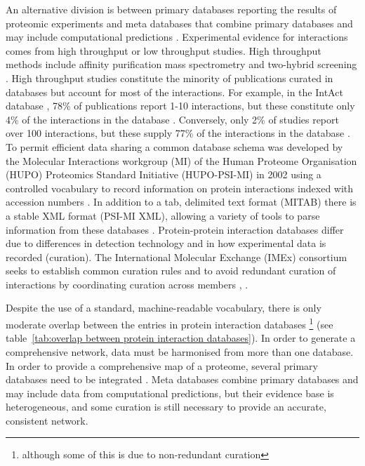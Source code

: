  An alternative division is between primary databases reporting the results of proteomic experiments and meta databases that combine primary databases and may include computational predictions \cite{dong2018analyses}. Experimental evidence for interactions comes from high throughput or low throughput studies. High throughput methods include affinity purification mass spectrometry and two-hybrid screening \cite{dong2018analyses}. High throughput studies constitute the minority of publications curated in databases but account for most of the interactions. For example, in the IntAct database \cite{hermjakob2004intact}, 78\% of publications report 1-10 interactions, but these constitute only 4\% of the interactions in the database \cite{dong2018analyses}. Conversely, only 2\% of studies report over 100 interactions, but these supply 77\% of the interactions in the database \cite{dong2018analyses}.  To permit efficient data sharing a common database schema was developed by the Molecular Interactions workgroup (MI) of the Human Proteome Organisation (HUPO) Proteomics Standard Initiative (HUPO-PSI-MI) in 2002 using a controlled vocabulary to record information on protein interactions indexed with accession numbers \cite{orchard2012molecular}. In addition to a tab, delimited text format (MITAB) there is a stable XML format (PSI-MI XML), allowing a variety of tools to parse information from these databases \cite{orchard2012molecular}.  Protein-protein interaction databases differ due to differences in detection technology and in how experimental data is recorded (curation). The International Molecular Exchange (IMEx) consortium seeks to establish common curation rules and to avoid redundant curation of interactions by coordinating curation across members \cite{orchard2012molecular}, \cite{orchard2012protein}.
 

Despite the use of a standard, machine-readable vocabulary, there is only moderate overlap between the entries in protein interaction databases\cite{dong2018analyses} \footnote{although some of this is due to non-redundant curation} (see table~\ref{tab:overlap between protein interaction databases}). In order to generate a comprehensive network, data must be harmonised from more than one database.  %
In order to provide a comprehensive map of a proteome, several primary databases need to be integrated \cite{alonso2019apid}.%
Meta databases combine primary databases and may include data from computational predictions, but their evidence base is heterogeneous, and some curation is still necessary to provide an accurate, consistent network.

